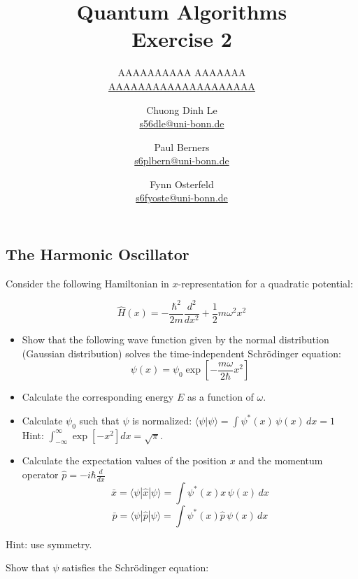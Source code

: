 \documentclass{article}
\title{Quantum Algorithms \\ Exercise 2}
\author{
  AAAAAAAAAA AAAAAAA \\ \href{mailto:AAAAAAAAAAAAAAAAAAAA}{AAAAAAAAAAAAAAAAAAAA} \and
  Chuong Dinh Le \\ \href{mailto:s56dle@uni-bonn.de}{s56dle@uni-bonn.de} \and
  Paul Berners \\ \href{mailto:s6plbern@uni-bonn.de}{s6plbern@uni-bonn.de} \and
  Fynn Osterfeld \\ \href{mailto:s6fyoste@uni-bonn.de}{s6fyoste@uni-bonn.de}
}
\begin{document}
  \maketitle

  \setcounter{section}{2}
  \subsection{The Harmonic Oscillator}
  \begin{centerframebox}
    Consider the following Hamiltonian in $x$-representation for a quadratic potential:

    \[ \hat{H}(x) = -\frac{\hbar^{2}}{2m}\frac{d^{2}}{d x^{2}}+\frac{1}{2}m\omega^{2}x^{2} \]

    \begin{itemize}
      \item Show that the following wave function given by the normal distribution (Gaussian distribution) solves the time-independent Schrödinger equation:
      \[ \psi(x) = \psi_0\exp\left[-\frac{m\omega}{2\hbar}x^{2}\right] \]
      \item Calculate the corresponding energy $E$ as a function of $\omega$.
      \item Calculate $\psi_0$ such that $\psi$ is normalized: $\langle\psi|\psi\rangle = \int\psi^{*}(x)\,\psi(x)\, dx = 1$ \\
      Hint: ${\int}_{-\infty}^{\infty}\exp[-x^{2}] dx = {\sqrt{\pi}}$.
      \item Calculate the expectation values of the position $x$ and the momentum operator $\hat{p} = -i\hbar \frac{d}{d x}$
      \[ \bar{x} = \langle\psi|\hat{x}|\psi\rangle = \int\psi^{*}(x) x\, \psi(x)\, dx \]
      \[ \bar{p} = \langle\psi|\hat{p}|\psi\rangle = \int\psi^{*}(x) \hat{p}\, \psi(x)\, dx \]
    \end{itemize}

    Hint: use symmetry.
  \end{centerframebox}
  Show that $\psi$ satisfies the Schrödinger equation:
\end{document}
